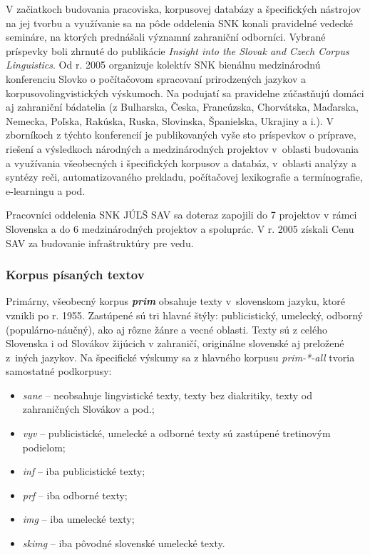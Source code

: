 \begin{multicols}{2}
V začiatkoch budovania pracoviska, korpusovej databázy a
špecifických nástrojov na jej tvorbu a využívanie sa na pôde
oddelenia SNK konali pravidelné vedecké semináre, na ktorých
prednášali významní zahraniční odborníci. Vybrané príspevky
boli zhrnuté do publikácie \emph{Insight into the Slovak and Czech Corpus Linguistics}\cite{simkova2006a}. Od r. 2005 organizuje kolektív SNK bienálnu medzinárodnú konferenciu
Slovko\cite{f10} o
počítačovom spracovaní prirodzených jazykov a
korpusovolingvistických výskumoch. Na podujatí sa pravidelne
zúčastňujú domáci aj zahraniční bádatelia (z Bulharska, Česka,
Francúzska, Chorvátska, Maďarska, Nemecka, Poľska, Rakúska, Ruska,
Slovinska, Španielska, Ukrajiny a i.). V zborníkoch z týchto
konferencií je publikovaných vyše sto príspevkov o príprave,
riešení a výsledkoch národných a medzinárodných projektov v~oblasti budovania a využívania všeobecných i špecifických korpusov
a databáz, v~oblasti analýzy a syntézy reči, automatizovaného
prekladu, počítačovej lexikografie a termínografie, e-learningu a
pod. 

Pracovníci oddelenia SNK JÚĽŠ SAV sa doteraz zapojili do 7
projektov v rámci Slovenska a do 6 medzinárodných projektov a
spoluprác\cite{f11}. V r. 2005
získali Cenu SAV za budovanie infraštruktúry pre vedu. 

\subsubsection{Korpus písaných textov}
Primárny, všeobecný korpus {\bf\emph{prim}} obsahuje texty
v~slovenskom jazyku, ktoré vznikli po r. 1955.  Zastúpené sú tri
hlavné štýly: publicistický, umelecký, odborný
(populárno-náučný), ako aj rôzne žánre a vecné oblasti. Texty
sú z celého Slovenska i od Slovákov žijúcich v zahraničí,
originálne slovenské aj preložené z~iných jazykov. Na špecifické
výskumy sa z hlavného korpusu \emph{prim-*-all} tvoria samostatné
podkorpusy:

\begin{itemize}
\item \emph{sane} – neobsahuje lingvistické texty, texty bez diakritiky, texty od zahraničných Slovákov a pod.;
\item \emph{vyv} – publicistické, umelecké a odborné texty sú zastúpené tretinovým podielom;
\item \emph{inf} – iba publicistické texty;
\item \emph{prf} – iba odborné texty;
\item \emph{img} – iba umelecké texty;
\item \emph{skimg} – iba pôvodné slovenské umelecké texty.
\end{itemize}


\end{multicols}

